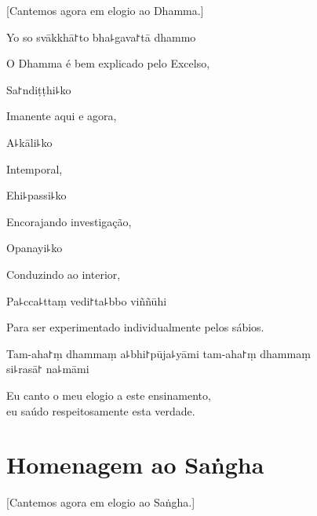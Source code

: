 \begin{english}
  [Cantemos agora em elogio ao Dhamma.]
\end{english}

Yo so svākkhā꜓to bha꜕gava꜓tā dhammo

\begin{english}
  O Dhamma é bem explicado pelo Excelso,
\end{english}

Sa꜓ndiṭṭhi꜕ko

\begin{english}
  Imanente aqui e agora,
\end{english}

A꜕kāli꜕ko

\begin{english}
  Intemporal,
\end{english}

Ehi꜕passi꜕ko

\begin{english}
  Encorajando investigação,
\end{english}

Opanayi꜕ko

\begin{english}
  Conduzindo ao interior,
\end{english}

Pa꜕cca꜕ttaṃ vedi꜓ta꜕bbo viññūhi

\begin{english}
  Para ser experimentado individualmente pelos sábios.
\end{english}

Tam-aha꜓ṃ dhammaṃ a꜕bhi꜓pūja꜕yāmi tam-aha꜓ṃ dhammaṃ \\si꜕rasā꜓ na꜕māmi

\begin{english}
  Eu canto o meu elogio a este ensinamento,\\
  eu saúdo respeitosamente esta verdade.
\end{english}

\clearpage

\chapter{Homenagem ao Saṅgha}

\begin{leader}
\end{leader}

\begin{english}
  [Cantemos agora em elogio ao Saṅgha.]
\end{english}

